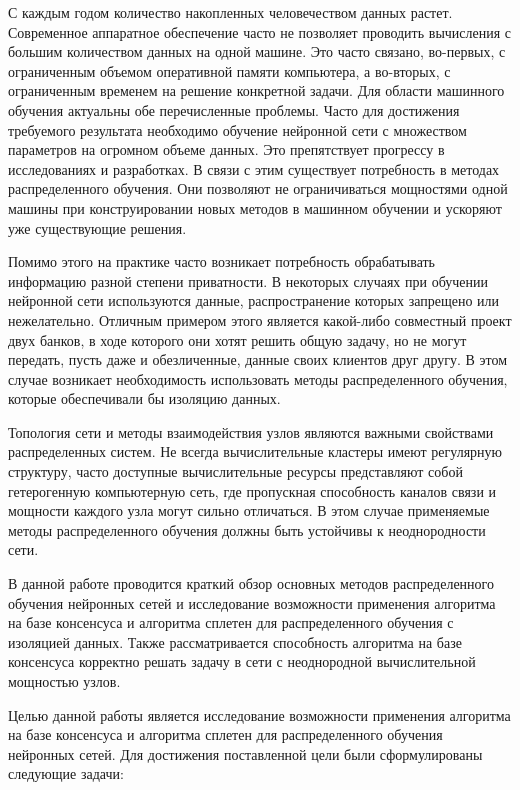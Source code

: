 \documentclass[a4paper,article,14pt]{extarticle}
\begin{document}


\tableofcontents
\pagebreak

С каждым годом количество накопленных человечеством данных растет. Современное аппаратное обеспечение часто не позволяет проводить вычисления
с большим количеством данных на одной машине. Это часто связано, во-первых, с ограниченным объемом оперативной памяти компьютера,
а во-вторых, с ограниченным временем на решение конкретной задачи. Для области машинного обучения актуальны обе перечисленные проблемы.
Часто для достижения требуемого результата необходимо обучение нейронной сети с множеством параметров на огромном объеме данных.
Это препятствует прогрессу в исследованиях и разработках.  В связи с этим существует потребность в методах распределенного обучения.
Они позволяют не ограничиваться мощностями одной машины при конструировании новых методов в машинном обучении
и ускоряют уже существующие решения.

Помимо этого на практике часто возникает потребность обрабатывать информацию разной степени приватности. В некоторых случаях
при обучении нейронной сети используются данные, распространение которых запрещено или нежелательно. Отличным примером этого
является какой-либо совместный проект двух банков, в ходе которого они хотят решить общую задачу, но не могут передать, пусть даже
и обезличенные, данные своих клиентов друг другу. В этом случае возникает необходимость использовать методы распределенного обучения, которые
обеспечивали бы изоляцию данных.

Топология сети и методы взаимодействия узлов являются важными свойствами распределенных систем. Не всегда вычислительные
кластеры имеют регулярную структуру, часто доступные вычислительные ресурсы представляют собой гетерогенную компьютерную сеть,
где пропускная способность каналов связи и мощности каждого узла могут сильно отличаться. В этом случае применяемые методы распределенного
обучения должны быть устойчивы к неоднородности сети.

В данной работе проводится краткий обзор основных методов распределенного обучения нейронных сетей и исследование возможности применения алгоритма на базе консенсуса и алгоритма сплетен для распределенного обучения с изоляцией данных. Также рассматривается
способность алгоритма на базе консенсуса корректно решать задачу в сети с неоднородной вычислительной мощностью узлов.
\pagebreak

Целью данной работы является исследование возможности применения алгоритма на базе консенсуса и алгоритма сплетен для распределенного
обучения нейронных сетей. Для достижения поставленной цели были сформулированы следующие задачи:
\end{document}
